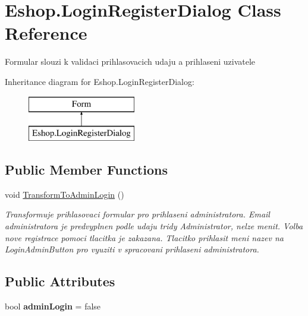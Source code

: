 \hypertarget{class_eshop_1_1_login_register_dialog}{}\section{Eshop.\+Login\+Register\+Dialog Class Reference}
\label{class_eshop_1_1_login_register_dialog}


Formular slouzi k validaci prihlasovacich udaju a prihlaseni uzivatele  


Inheritance diagram for Eshop.\+Login\+Register\+Dialog\+:\begin{figure}[H]
\begin{center}
\leavevmode
\includegraphics[height=2.000000cm]{class_eshop_1_1_login_register_dialog}
\end{center}
\end{figure}
\subsection*{Public Member Functions}
\begin{DoxyCompactItemize}
\item 
void \mbox{\hyperlink{class_eshop_1_1_login_register_dialog_ac2f34eacf82e380a9578df9c77504398}{Transform\+To\+Admin\+Login}} ()
\begin{DoxyCompactList}\small\item\em Transformuje prihlasovaci formular pro prihlaseni administratora. Email administratora je predvyplnen podle udaju tridy Administrator, nelze menit. Volba nove registrace pomoci tlacitka je zakazana. Tlacitko prihlasit meni nazev na Login\+Admin\+Button pro vyuziti v spracovani prihlaseni administratora. \end{DoxyCompactList}\end{DoxyCompactItemize}
\subsection*{Public Attributes}
\begin{DoxyCompactItemize}
\item 
\mbox{\label{class_eshop_1_1_login_register_dialog_a89890106585a1084a343604ded8e04c3}} 
bool {\bfseries admin\+Login} = false
\end{DoxyCompactItemize}
